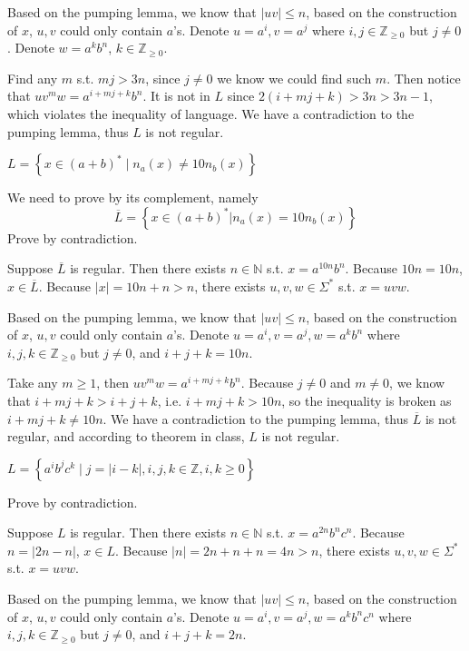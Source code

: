 \documentclass[a4paper]{article}
\newcommand{\N}{\mathbb{N}}
\newcommand{\Z}{\mathbb{Z}}
\begin{document}
Based on the pumping lemma, we know that $|uv|\le n$, based on the construction of $x$,  $u,v$ could only contain  $a$'s. Denote  $u=a^i,v=a^j$ where  $i,j \in \Z_{\ge 0}$ but $j\neq 0$. Denote $w=a^kb^n$,  $k \in \Z_{\ge 0}$.

Find any $m$ s.t.  $mj > 3n$, since  $j\neq 0$ we know we could find such $m$. Then notice that  $uv^mw=a^{i+mj+k}b^n$. It is not in $L$ since  $2(i+mj+k) > 3n > 3n-1$, which violates the inequality of language. We have a contradiction to the pumping lemma, thus  $L$ is not regular.

\bigskip

\begin{tcolorbox}[enhanced,breakable,colback=white]
$L = \left\{x \in(a+b)^{*} \mid n_{a}(x) \neq 10 n_{b}(x)\right\}$
\end{tcolorbox}
We need to prove by its complement, namely \[
	\overline{L} = \left\{ x \in (a+b)^* | n_a(x) = 10n_b(x) \right\} 
\]
Prove by contradiction.

Suppose $\overline{L}$ is regular. Then there exists $n \in \N$ s.t. $x = a^{10n}b^n$. Because $10n=10n$,  $x \in \overline{L}$. Because $|x|=10n+n>n$, there exists  $u,v,w \in \Sigma^*$ s.t. $x=uvw$.

Based on the pumping lemma, we know that  $|uv|\le n$, based on the construction of $x$,  $u,v$ could only contain  $a$'s. Denote  $u=a^i,v=a^j,w=a^kb^n$ where  $i,j,k \in \Z_{\ge 0}$ but  $j\neq 0$, and $i+j+k=10n$.

Take any  $m\ge 1$, then $uv^mw=a^{i+mj+k}b^n$. Because $j\neq 0$ and $m \neq 0$, we know that $i+mj+k>i+j+k$, i.e. $i+mj+k>10n$, so the inequality is broken as  $i+mj+k \neq 10n$. We have a contradiction to the pumping lemma, thus $\overline{L}$ is not regular, and according to theorem in class, $L$ is not regular.

\bigskip

\begin{tcolorbox}[enhanced,breakable,colback=white]
$L=\left\{a^{i} b^{j} c^{k}\mid j= |i-k|, i, j, k \in \mathbb{Z}, i, k \geq 0\right\}$
\end{tcolorbox}
Prove by contradiction.

Suppose $L$ is regular. Then there exists  $n \in  \N$ s.t. $x = a^{2n}b^nc^n$. Because  $n=|2n-n|$,  $x \in L$. Because $|n|=2n+n+n=4n>n$, there exists  $u,v,w \in \Sigma^*$ s.t. $x=uvw$.

Based on the pumping lemma, we know that  $|uv|\le n$, based on the construction of $x$,  $u,v$ could only contain  $a$'s. Denote  $u=a^i,v=a^j,w=a^kb^nc^n$ where  $i,j,k \in \Z_{\ge 0}$ but $j\neq 0$, and $i+j+k=2n$.
\end{document}
